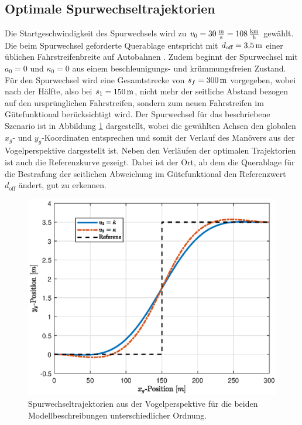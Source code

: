 \subsection{Optimale Spurwechseltrajektorien}\label{subsec:Spurwechseltrajektorien}
Die Startgeschwindigkeit des Spurwechsels wird zu $v_0 = 30\,\mathrm{\frac{\mathrm{m}}{\mathrm{s}}} = 108\,\mathrm{\frac{\mathrm{km}}{\mathrm{h}}}$ gewählt. Die beim Spurwechsel geforderte Querablage entspricht mit $d_{\textrm{off}} = 3{,}5\,\mathrm{m}$ einer üblichen Fahrstreifenbreite auf Autobahnen \cite{ForschungsgesellschaftfurStraenundVerkehrswesen.2008}. Zudem beginnt der Spurwechsel mit $a_0 = 0$ und $\kappa_0 = 0$ aus einem beschleunigungs- und krümmungsfreien Zustand. Für den Spurwechsel wird eine Gesamtstrecke von $s_f = 300\,\mathrm{m}$ vorgegeben, wobei nach der Hälfte, also bei $s_1 = 150\,\mathrm{m}$, nicht mehr der seitliche Abstand bezogen auf den ursprünglichen Fahrstreifen, sondern zum neuen Fahrstreifen im Gütefunktional berücksichtigt wird. Der Spurwechsel für das beschriebene Szenario ist in Abbildung \ref{fig:xy_pos_s300_v30} dargestellt, wobei die gewählten Achsen den globalen $x_g$- und $y_g$-Koordinaten entsprechen und somit der Verlauf des Manövers aus der Vogelperspektive dargestellt ist. Neben den Verläufen der optimalen Trajektorien ist auch die Referenzkurve gezeigt. Dabei ist der Ort, ab dem die Querablage für die Bestrafung der seitlichen Abweichung im Gütefunktional den Referenzwert $d_{\textrm{off}}$ ändert, gut zu erkennen. 
\begin{figure}[h] 
	\centering
	\includegraphics[width=0.7\linewidth]{./Bilder/Ergebnisse/Geradeausfahrt/Spurwechsel/xy_pos_s300_v30.eps}
	\caption{Spurwechseltrajektorien aus der Vogelperspektive für die beiden Modellbeschreibungen unterschiedlicher Ordnung.}
	\label{fig:xy_pos_s300_v30}
\end{figure} 
